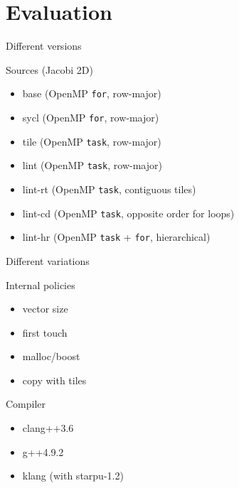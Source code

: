 \documentclass[10pt, compress]{beamer}
\begin{document}

\section{Evaluation}


\begin{frame}[fragile]{Different versions}

\begin{block}{Sources (Jacobi 2D)}
\begin{itemize}
\item base (OpenMP \verb!for!, row-major)
\item sycl (OpenMP \verb!for!, row-major)
\item tile (OpenMP \verb!task!, row-major)
\item lint (OpenMP \verb!task!, row-major)
\item lint-rt (OpenMP \verb!task!, contiguous tiles)
\item lint-cd (OpenMP \verb!task!, opposite order for loops)
\item lint-hr (OpenMP \verb!task! + \verb!for!, hierarchical)
\end{itemize}
\end{block}
\end{frame}

\begin{frame}{Different variations}

\begin{block}{Internal policies}
\begin{itemize}
\item vector size 
\item first touch
\item malloc/boost
\item copy with tiles
\end{itemize}
\end{block}

\begin{block}{Compiler}
\begin{itemize}
\item clang++3.6
\item g++4.9.2
\item klang (with starpu-1.2)
\end{itemize}
\end{block}

\end{frame}
\end{document}
